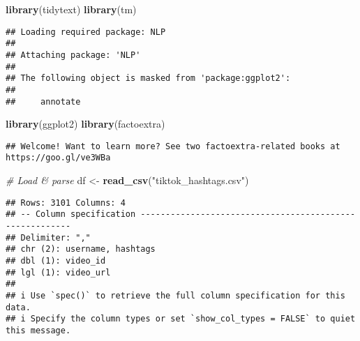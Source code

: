 \documentclass[
]{article}
\newenvironment{Shaded}{\begin{snugshade}}{\end{snugshade}}
\newcommand{\CommentTok}[1]{\textcolor[rgb]{0.56,0.35,0.01}{\textit{#1}}}
\newcommand{\FunctionTok}[1]{\textcolor[rgb]{0.13,0.29,0.53}{\textbf{#1}}}
\newcommand{\NormalTok}[1]{#1}
\newcommand{\OtherTok}[1]{\textcolor[rgb]{0.56,0.35,0.01}{#1}}
\newcommand{\StringTok}[1]{\textcolor[rgb]{0.31,0.60,0.02}{#1}}
\begin{document}
\begin{Shaded}
\begin{Highlighting}[]
\FunctionTok{library}\NormalTok{(tidytext)}
\FunctionTok{library}\NormalTok{(tm)}
\end{Highlighting}
\end{Shaded}

\begin{verbatim}
## Loading required package: NLP
## 
## Attaching package: 'NLP'
## 
## The following object is masked from 'package:ggplot2':
## 
##     annotate
\end{verbatim}

\begin{Shaded}
\begin{Highlighting}[]
\FunctionTok{library}\NormalTok{(ggplot2)}
\FunctionTok{library}\NormalTok{(factoextra)}
\end{Highlighting}
\end{Shaded}

\begin{verbatim}
## Welcome! Want to learn more? See two factoextra-related books at https://goo.gl/ve3WBa
\end{verbatim}

\begin{Shaded}
\begin{Highlighting}[]
\CommentTok{\# Load \& parse}
\NormalTok{df }\OtherTok{\textless{}{-}} \FunctionTok{read\_csv}\NormalTok{(}\StringTok{"tiktok\_hashtags.csv"}\NormalTok{)}
\end{Highlighting}
\end{Shaded}

\begin{verbatim}
## Rows: 3101 Columns: 4
## -- Column specification --------------------------------------------------------
## Delimiter: ","
## chr (2): username, hashtags
## dbl (1): video_id
## lgl (1): video_url
## 
## i Use `spec()` to retrieve the full column specification for this data.
## i Specify the column types or set `show_col_types = FALSE` to quiet this message.
\end{verbatim}
\end{document}
